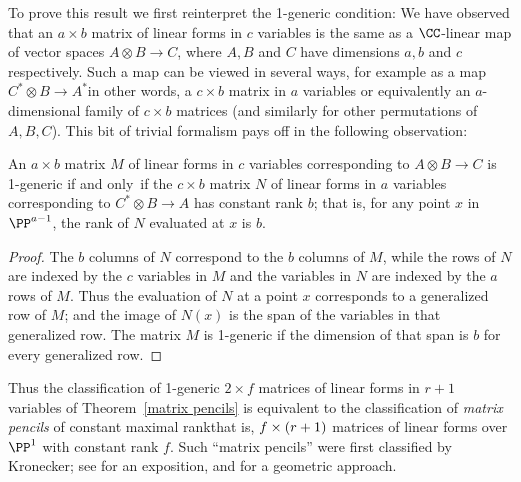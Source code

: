To prove this result we first reinterpret the 1-generic condition:
We have observed that an
$a\times b$ matrix of linear forms in $c$ variables is the same as a
$\CC$-linear map of vector spaces
$A \otimes B \to C$, where $A, B$ and $C$ have dimensions $a,b$ and $c$
respectively. Such a map
can be viewed in several ways, for example as a map $C^{*} \otimes B\to
A^{*}$\emdash in other words, a $c\times b$ matrix in $a$ variables\emdash
or equivalently an $a$-dimensional family of $c\times b$ matrices (and
similarly for other permutations of $A,B,C$).
This bit of trivial formalism pays off in the following observation:

\begin{proposition}\label{reinterpretation of 1-generic}
An  $a\times b$ matrix $M$ of linear forms in $c$ variables  corresponding
to $A\otimes B \to C$ is 1-generic if and only~if the $c \times b$ matrix
$N$ of linear forms in $a$ variables corresponding to $C^{*}\otimes B
\to A$ has constant rank $b$; that is,
for any point $x$ in $\PP^{a-1}$, the rank of $N$ evaluated at $x$ is $b$.
\unif
\end{proposition}

\begin{proof}
The $b$ columns of $N$ correspond to the $b$ columns of $M$, while the
rows of $N$ are indexed
by the $c$ variables in $M$ and the variables in $N$ are indexed by the
$a$ rows of $M$. Thus the
evaluation of $N$ at a point $x$ corresponds to a generalized row of $M$;
and the image of $N(x)$
is the span of the variables in that generalized row. The matrix $M$
is 1-generic if the dimension
of that span is $b$ for every generalized row.
\end{proof}

Thus the classification of 1-generic $2\times f$ matrices of linear
forms in $r+1$ variables of Theorem~\ref{matrix pencils} is equivalent
to the classification
of \emph{matrix pencils} of constant maximal rank\emdash that is, $f \times
\index{matrix pencil}%
(r+1)$ matrices of linear forms over $\PP^{1}$ with constant rank $f$.
Such ``matrix pencils'' were first classified by Kronecker; see
%
\cite[Chapter 12]{Gantmacher} for an exposition, and
\cite{Eisenbud-Harris-Centennial} for a geometric approach.

